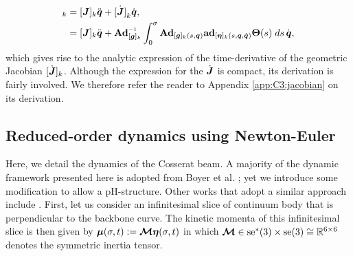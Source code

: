 %
\begin{align}
[\dot{\vec{\eta}}]_k & = [\mat{J}]_k\ddot{\vec{q}} + \dot{[\mat{J}]}_k\dot{\vec{q}}, \notag \\
& = [\mat{J}]_k\ddot{\vec{q}} + \Ad_{[\mat{g}]_k}\inv \int_0^\sigma \Ad_{[\mat{g}]_k(s,\q)} \ad_{[\vec{\eta}]_k(s,\q,\dq)} \mat{\Theta}(s) \; ds \,\dot{\q} \label{eq:C3:deta_analytic},
\end{align}
%
which gives rise to the analytic expression of the time-derivative of the geometric Jacobian $[\dot{\boldsymbol{J}}]_k$.
Although the expression for the $\dot{{\boldsymbol{J}}}$ is compact, its derivation is fairly involved. We therefore refer the reader to Appendix \ref{app:C3:jacobian} on its derivation. 
\subsection{Reduced-order dynamics using Newton-Euler}
Here, we detail the dynamics of the Cosserat beam. A majority of the dynamic framework presented here is adopted from Boyer et al. \cite{Boyer2021}; yet we introduce some modification to allow a pH-structure. Other works that adopt a similar approach include \cite{Renda2018,Renda2020,Till2019,Garofalo2013}. First, let us consider an infinitesimal slice of continuum body that is perpendicular to the backbone curve. The kinetic momenta of this infinitesimal slice is then given by $\boldsymbol{\mu}(\sigma,t) := {\boldsymbol{\mathcal{M}}} \boldsymbol{\eta}(\sigma,t)$ in which ${\boldsymbol{\mathcal{M}}} \in \textup{\textrm{se}}^*(3) \times \textup{\textrm{se}}(3) \cong \mathbb{R}^{6\times 6}$ denotes the symmetric inertia tensor.
%
\vspace{-2mm}
